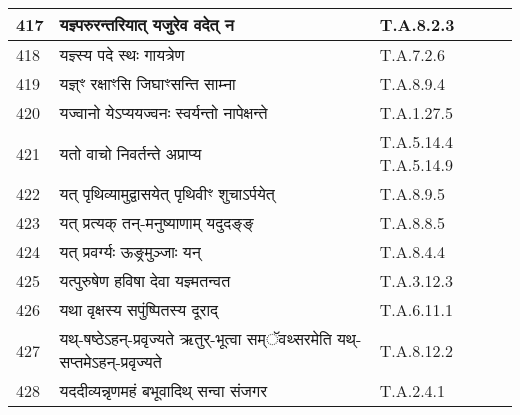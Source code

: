 \documentclass[17pt]{extarticle}
\begin{document}
\begin{longtable}{||p{0.4in}||p{4.9in}||p{0.9in}||}
    \hline
        
    417 & यज्ञ्परुरन्तरियात् यजुरेव वदेत् न & T.A.8.2.3       \\
    
    \hline
        
    418 & यज्ञ्स्य पदे स्थः गायत्रेण & T.A.7.2.6       \\
    
    \hline
        
    419 & यज्ञ्ꣳ रक्षाꣳसि जिघाꣳसन्ति साम्ना & T.A.8.9.4       \\
    
    \hline
        
    420 & यज्वानो येऽप्ययज्वनः स्वर्यन्तो नापेक्षन्ते & T.A.1.27.5       \\
    
    \hline
        
    421 & यतो वाचो निवर्तन्ते अप्राप्य & T.A.5.14.4 T.A.5.14.9       \\
    
    \hline
        
    422 & यत् पृथिव्यामुद्वासयेत् पृथिवीꣳ शुचाऽर्पयेत् & T.A.8.9.5       \\
    
    \hline
        
    423 & यत् प्रत्यक् तन्{-}मनुष्याणाम् यदुदङ्ङ् & T.A.8.8.5       \\
    
    \hline
        
    424 & यत् प्रवर्ग्यः ऊङ्र्मुञ्जाः यन् & T.A.8.4.4       \\
    
    \hline
        
    425 & यत्पुरुषेण हविषा देवा यज्ञ्मतन्वत & T.A.3.12.3       \\
    
    \hline
        
    426 & यथा वृक्षस्य सपुंष्पितस्य दूराद् & T.A.6.11.1       \\
    
    \hline
        
    427 & यथ्{-}षष्ठेऽहन्{-}प्रवृज्यते ऋतुर्{-}भूत्वा सम्ॅवथ्सरमेति यथ्{-}सप्तमेऽहन्{-}प्रवृज्यते & T.A.8.12.2       \\
    
    \hline
        
    428 & यददीव्यन्नृणमहं बभूवादिथ् सन्वा संजगर & T.A.2.4.1       \\
    

\end{longtable}
\end{document}
